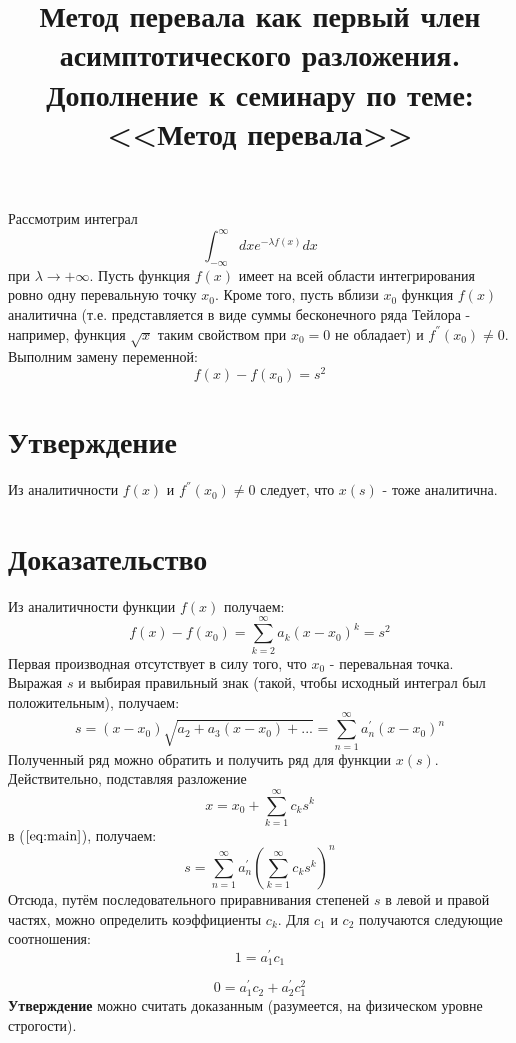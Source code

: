 \documentclass[a4paper,12pt]{article}
\begin{document}
\title{Метод перевала как первый член асимптотического разложения. Дополнение к семинару по теме: <<Метод перевала>>}
\maketitle
Рассмотрим интеграл
$$
\int_{-\infty}^{\infty}dxe^{-\lambda f(x)}dx
$$
при $\lambda\to+\infty$. Пусть функция $f(x)$ имеет на всей области интегрирования ровно одну перевальную точку $x_0$. Кроме того, пусть вблизи $x_0$ функция $f(x)$ аналитична (т.е. представляется в виде суммы бесконечного ряда Тейлора - например, функция $\sqrt{x}$ таким свойством при $x_0=0$ не обладает) и $f^{''}(x_0)\ne0$. Выполним замену переменной:
$$
f(x)-f(x_0)=s^2
$$
\section*{Утверждение} Из аналитичности $f(x)$ и $f^{''}(x_0)\ne0$ следует, что $x(s)$ - тоже аналитична.
\section*{Доказательство}
Из аналитичности функции $f(x)$ получаем:
$$
f(x)-f(x_0)=\sum_{k=2}^{\infty}a_k (x-x_0)^k=s^2
$$
Первая производная отсутствует в силу того, что $x_0$ - перевальная точка. Выражая $s$ и выбирая правильный знак (такой, чтобы исходный интеграл был положительным), получаем:
\begin{equation}\label{eq:main}
s=(x-x_0)\sqrt{a_2+a_3(x-x_0)+...}=\sum_{n=1}^{\infty}a_{n}^{'}(x-x_0)^n
\end{equation}
Полученный ряд можно обратить и получить ряд для функции $x(s)$. Действительно, подставляя разложение
$$
x=x_0+\sum_{k=1}^{\infty}c_ks^k
$$
в ($\ref{eq:main}$), получаем:
$$
s=\sum_{n=1}^{\infty}a_n^{'}\left(\sum_{k=1}^{\infty}c_ks^k\right)^n
$$
Отсюда, путём последовательного приравнивания степеней $s$ в левой и правой частях, можно определить коэффициенты $c_k$. Для $c_1$ и $c_2$ получаются следующие соотношения:
$$
1=a_1^{'}c_1
$$

$$
0=a_1^{'}c_2+a_2^{'}c_1^2
$$
\textbf{Утверждение} можно считать доказанным (разумеется, на физическом уровне строгости).
\end{document}
